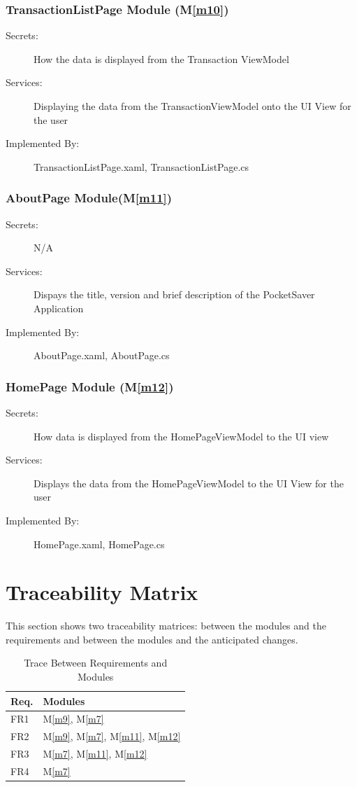 \documentclass[12pt, titlepage]{article}
\newcommand{\mref}[1]{M\ref{#1}}
\begin{document}
\subsubsection{TransactionListPage Module (\mref{m10})} 
\begin{description} 
\item[Secrets:] How the data is displayed from the Transaction ViewModel 
\item[Services:] Displaying the data from the TransactionViewModel onto the UI View for the user
\item[Implemented By:] TransactionListPage.xaml, TransactionListPage.cs 
\end{description}

\subsubsection{AboutPage Module(\mref{m11})}
\begin{description} 
\item[Secrets:] N/A 
\item[Services:] Dispays the title, version and brief description of the PocketSaver Application 
\item[Implemented By:] AboutPage.xaml, AboutPage.cs 
\end{description}

\subsubsection{HomePage Module (\mref{m12})} 
\begin{description}
\item[Secrets:] How data is displayed from the HomePageViewModel to the UI view
\item[Services:] Displays the data from the HomePageViewModel to the UI View for the user
\item[Implemented By:] HomePage.xaml, HomePage.cs 
\end{description}

\section{Traceability Matrix} \label{SecTM}

This section shows two traceability matrices: between the modules and the
requirements and between the modules and the anticipated changes.

\begin{table}[H]
\centering
\begin{tabular}{p{} p{}}
\toprule
\textbf{Req.} & \textbf{Modules}\\
\midrule
FR1 & \mref{m9}, \mref{m7}\\
FR2 & \mref{m9}, \mref{m7}, \mref{m11}, \mref{m12}\\
FR3 & \mref{m7}, \mref{m11}, \mref{m12}\\
FR4 & \mref{m7}\\
\bottomrule
\end{tabular}
\caption{Trace Between Requirements and Modules}
\label{TblRT}
\end{table}
\end{document}
